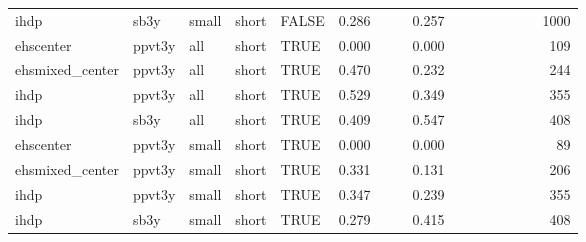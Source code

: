 \begin{table}[ht]
\begin{tabular}{lllllrrrrrrrrrrr}
  ihdp & sb3y & small & short & FALSE & 0.286 &  &  & 0.257 &  &  &  &  &  &  & 1000 \\ 
  ehscenter & ppvt3y & all & short & TRUE & 0.000 &  &  & 0.000 &  &  &  &  &  &  & 109 \\ 
  ehsmixed\_center & ppvt3y & all & short & TRUE & 0.470 &  &  & 0.232 &  &  &  &  &  &  & 244 \\ 
  ihdp & ppvt3y & all & short & TRUE & 0.529 &  &  & 0.349 &  &  &  &  &  &  & 355 \\ 
  ihdp & sb3y & all & short & TRUE & 0.409 &  &  & 0.547 &  &  &  &  &  &  & 408 \\ 
  ehscenter & ppvt3y & small & short & TRUE & 0.000 &  &  & 0.000 &  &  &  &  &  &  & 89 \\ 
  ehsmixed\_center & ppvt3y & small & short & TRUE & 0.331 &  &  & 0.131 &  &  &  &  &  &  & 206 \\ 
  ihdp & ppvt3y & small & short & TRUE & 0.347 &  &  & 0.239 &  &  &  &  &  &  & 355 \\ 
  ihdp & sb3y & small & short & TRUE & 0.279 &  &  & 0.415 &  &  &  &  &  &  & 408 \\ 
   \hline
\end{tabular}
\end{table}
